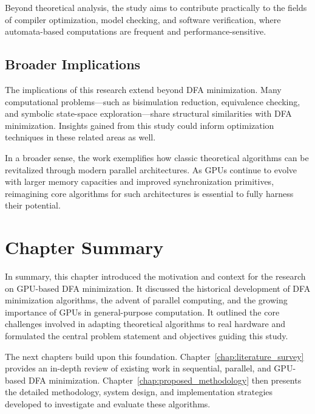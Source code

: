 Beyond theoretical analysis, the study aims to contribute practically to the fields of compiler optimization, model checking, and software verification, where automata-based computations are frequent and performance-sensitive.

\subsection{Broader Implications}

The implications of this research extend beyond DFA minimization. Many computational problems—such as bisimulation reduction, equivalence checking, and symbolic state-space exploration—share structural similarities with DFA minimization. Insights gained from this study could inform optimization techniques in these related areas as well.

In a broader sense, the work exemplifies how classic theoretical algorithms can be revitalized through modern parallel architectures. As GPUs continue to evolve with larger memory capacities and improved synchronization primitives, reimagining core algorithms for such architectures is essential to fully harness their potential.

\section{Chapter Summary}

In summary, this chapter introduced the motivation and context for the research on GPU-based DFA minimization. It discussed the historical development of DFA minimization algorithms, the advent of parallel computing, and the growing importance of GPUs in general-purpose computation. It outlined the core challenges involved in adapting theoretical algorithms to real hardware and formulated the central problem statement and objectives guiding this study.

The next chapters build upon this foundation. Chapter~\ref{chap:literature_survey} provides an in-depth review of existing work in sequential, parallel, and GPU-based DFA minimization. Chapter~\ref{chap:proposed_methodology} then presents the detailed methodology, system design, and implementation strategies developed to investigate and evaluate these algorithms.
